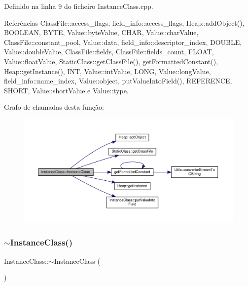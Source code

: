 Definido na linha 9 do ficheiro Instance\+Class.\+cpp.



Referências Class\+File\+::access\+\_\+flags, field\+\_\+info\+::access\+\_\+flags, Heap\+::add\+Object(), B\+O\+O\+L\+E\+AN, B\+Y\+TE, Value\+::byte\+Value, C\+H\+AR, Value\+::char\+Value, Class\+File\+::constant\+\_\+pool, Value\+::data, field\+\_\+info\+::descriptor\+\_\+index, D\+O\+U\+B\+LE, Value\+::double\+Value, Class\+File\+::fields, Class\+File\+::fields\+\_\+count, F\+L\+O\+AT, Value\+::float\+Value, Static\+Class\+::get\+Class\+File(), get\+Formatted\+Constant(), Heap\+::get\+Instance(), I\+NT, Value\+::int\+Value, L\+O\+NG, Value\+::long\+Value, field\+\_\+info\+::name\+\_\+index, Value\+::object, put\+Value\+Into\+Field(), R\+E\+F\+E\+R\+E\+N\+CE, S\+H\+O\+RT, Value\+::short\+Value e Value\+::type.

Grafo de chamadas desta função\+:\nopagebreak
\begin{figure}[H]
\begin{center}
\leavevmode
\includegraphics[width=350pt]{classInstanceClass_a86ab031eb0f0240b0a54423003000322_cgraph}
\end{center}
\end{figure}
\mbox{\label{classInstanceClass_a441cc692dedc481373b7e670fab72556}} 
\subsubsection{\texorpdfstring{$\sim$\+Instance\+Class()}{~InstanceClass()}}
{\footnotesize\ttfamily Instance\+Class\+::$\sim$\+Instance\+Class (\begin{DoxyParamCaption}{ }\end{DoxyParamCaption})}



